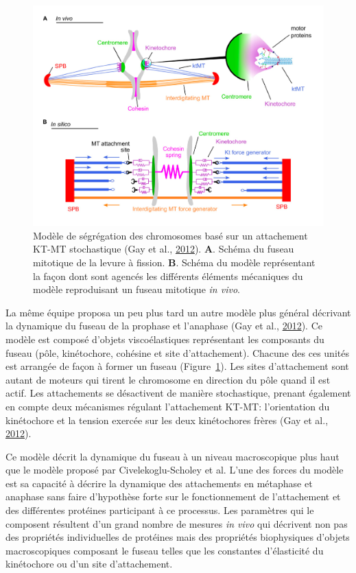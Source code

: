 \documentclass[12pt,a4paper,twoside,openright]{book}
\begin{document}
\begin{figure}[htbp]
\centering
\includegraphics{figures/intro/gay.png}
\caption[Modèle de ségrégation des chromosomes]{\label{fig:gay}Modèle de
ségrégation des chromosomes basé sur un attachement KT-MT stochastique
(Gay et al., \protect\hyperlink{ref-Gay2012a}{2012}). \textbf{A}. Schéma
du fuseau mitotique de la levure à fission. \textbf{B}. Schéma du modèle
représentant la façon dont sont agencés les différents éléments
mécaniques du modèle reproduisant un fuseau mitotique \emph{in vivo}.}
\end{figure}

La même équipe proposa un peu plus tard un autre modèle plus général
décrivant la dynamique du fuseau de la prophase et l'anaphase (Gay et
al., \protect\hyperlink{ref-Gay2012a}{2012}). Ce modèle est composé
d'objets viscoélastiques représentant les composants du fuseau (pôle,
kinétochore, cohésine et site d'attachement). Chacune des ces unités est
arrangée de façon à former un fuseau (Figure~\ref{fig:gay}). Les sites
d'attachement sont autant de moteurs qui tirent le chromosome en
direction du pôle quand il est actif. Les attachements se désactivent de
manière stochastique, prenant également en compte deux mécanismes
régulant l'attachement KT-MT: l'orientation du kinétochore et la tension
exercée sur les deux kinétochores frères (Gay et al.,
\protect\hyperlink{ref-Gay2012a}{2012}).

Ce modèle décrit la dynamique du fuseau à un niveau macroscopique plus
haut que le modèle proposé par Civelekoglu-Scholey et al. L'une des
forces du modèle est sa capacité à décrire la dynamique des attachements
en métaphase et anaphase sans faire d'hypothèse forte sur le
fonctionnement de l'attachement et des différentes protéines participant
à ce processus. Les paramètres qui le composent résultent d'un grand
nombre de mesures \emph{in vivo} qui décrivent non pas des propriétés
individuelles de protéines mais des propriétés biophysiques d'objets
macroscopiques composant le fuseau telles que les constantes
d'élasticité du kinétochore ou d'un site d'attachement.
\end{document}
